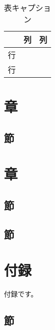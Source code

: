 \documentclass[a5paper]{jsbook}
\begin{document}
\begin{table}[tb]
\caption{表キャプション}
\label{t1}
\begin{center}
\begin{tabular}{c|cc}
\hline
 & 列 & 列\\
\hline
行 & & \\
行 & & \\
\hline
\end{tabular}
\end{center}
\end{table}

\chapter{章}

\section{節}
\subsection{}
\subsection{}

\chapter{章}

\section{節}
\section{節}


\appendix
\chapter{付録}

付録です。

\section{節}
\subsection{}
\subsection{}
\end{document}
